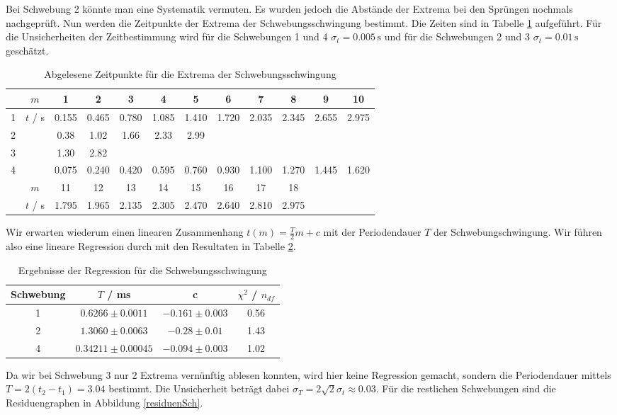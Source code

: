 Bei Schwebung 2 könnte man eine Systematik vermuten. Es wurden jedoch die Abstände der Extrema bei den Sprüngen nochmals nachgeprüft. Nun werden die Zeitpunkte der Extrema der Schwebungsschwingung bestimmt. Die Zeiten sind in Tabelle \ref{tabTimeSch} aufgeführt. Für die Unsicherheiten der Zeitbestimmung wird für die Schwebungen 1 und 4 $\sigma_t = 0.005 \, \mathrm s$ und für die Schwebungen 2 und 3 $\sigma_t = 0.01 \, \mathrm s$ geschätzt.
\begin{table}[H]
\centering
\begin{tabular}{c|c|cccccccccc}
& $m$ & 1 & 2 & 3 & 4 & 5 & 6 & 7 & 8 & 9 & 10 \\
\hline
1 & \multirow{4}{*}{$t$ / s} & 0.155 & 0.465 & 0.780 & 1.085 & 1.410 & 1.720 & 2.035 & 2.345 & 2.655 & 2.975 \\
\cline{1-1}\cline{3-12}
2 & & 0.38 & 1.02 & 1.66 & 2.33 & 2.99 & & & & & \\
\cline{1-1}\cline{3-12}
3 & & 1.30 & 2.82 & & & & & & & & \\
\cline{1-1}\cline{3-12}
\multirow{3}{*}{4}
& & 0.075 & 0.240 & 0.420 & 0.595 & 0.760 & 0.930 & 1.100 & 1.270 & 1.445 & 1.620 \\
\cline{2-12}
& $m$ & 11 & 12 & 13 & 14 & 15 & 16 & 17 & 18 & & \\
\cline{2-12}
& $t$ / s & 1.795 & 1.965 & 2.135 & 2.305 & 2.470 & 2.640 & 2.810 & 2.975 & & 
\end{tabular}
\caption{Abgelesene Zeitpunkte für die Extrema der Schwebungsschwingung}
\label{tabTimeSch}
\end{table}
Wir erwarten wiederum einen linearen Zusammenhang $t(m) = \frac T2m + c$ mit der Periodendauer $T$ der Schwebungschwingung. Wir führen also eine lineare Regression durch mit den Resultaten in Tabelle \ref{tabRegressionSch}.

\begin{table}[H]
\centering
\begin{tabular}{c|c|c|c}
Schwebung & $T$ / ms & c & $\chi^2$ / $n_{df}$ \\
\hline
1 & $ 0.6266 \pm 0.0011$ & $ -0.161 \pm 0.003$ & 0.56 \\
2 & $ 1.3060 \pm 0.0063$ & $ -0.28 \pm 0.01$ & 1.43 \\
4 & $ 0.34211 \pm 0.00045$ & $ -0.094 \pm 0.003$ & 1.02
\end{tabular}
\caption{Ergebnisse der Regression für die Schwebungsschwingung}
\label{tabRegressionSch}
\end{table}
Da wir bei Schwebung 3 nur 2 Extrema vernünftig ablesen konnten, wird hier keine Regression gemacht, sondern die Periodendauer mittels $T = 2(t_2-t_1) = 3.04$ bestimmt. Die Unsicherheit beträgt dabei $\sigma_T = 2\sqrt{2} \sigma_t \approx 0.03$. Für die restlichen Schwebungen sind die Residuengraphen in Abbildung \ref{residuenSch}.

